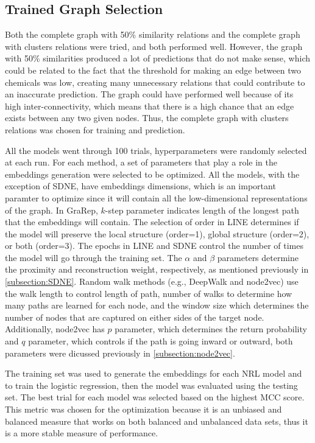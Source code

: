\subsection{Trained Graph Selection}

Both the complete graph with 50\% similarity relations and the complete graph with clusters relations were tried, and both performed well.
However, the graph with 50\% similarities produced a lot of predictions that do not make sense, which could be related to the fact that the threshold for making an edge between two chemicals was low, creating many unnecessary relations that could contribute to an inaccurate prediction.
The graph could have performed well because of its high inter-connectivity, which means that there is a high chance that an edge exists between any two given nodes.
Thus, the complete graph with clusters relations was chosen for training and prediction.

All the models went through 100 trials, hyperparameters were randomly selected at each run.
For each method, a set of parameters that play a role in the embeddings generation were selected to be optimized.
All the models, with the exception of SDNE, have embeddings dimensions, which is an important paramter to optimize since it will contain all the low-dimensional representations of the graph.
In GraRep, $k$-step parameter indicates length of the longest path that the embeddings will contain.
The selection of order in \ac{LINE} determines if the model will preserve the local structure (order=1), global structure (order=2), or both (order=3).
The epochs in \ac{LINE} and \ac{SDNE} control the number of times the model will go through the training set.
The $\alpha$ and $\beta$ parameters determine the proximity and reconstruction weight, respectively, as mentioned previously in \ref{subsection:SDNE}.
Random walk methods (e.g., DeepWalk and node2vec) use the walk length to control length of path, number of walks to determine how many paths are learned for each node, and the window size which determines the number of nodes that are captured on either sides of the target node.
Additionally, node2vec has $p$ parameter, which determines the return probability and $q$ parameter, which controls if the path is going inward or outward, both parameters were dicussed previously in \ref{subsection:node2vec}.

The training set was used to generate the embeddings for each \ac{NRL} model and to train the logistic regression, then the model was evaluated using the testing set.
The best trial for each model was selected based on the highest \ac{MCC} score.
This metric was chosen for the optimization because it is an unbiased and balanced measure that works on both balanced and unbalanced data sets, thus it is a more stable measure of performance.

